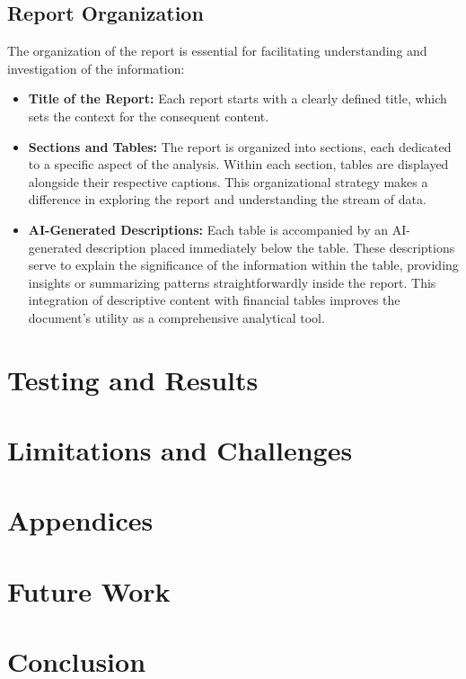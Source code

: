 \subsection{Report Organization}
The organization of the report is essential for facilitating understanding and investigation of the information: %
\begin{itemize}
    \item \textbf{Title of the Report:} Each report starts with a clearly defined title, which sets the context for the consequent content.
    
    \item \textbf{Sections and Tables:} The report is organized into sections, each dedicated to a specific aspect of the analysis. Within each section, tables are displayed alongside their respective captions. This organizational strategy makes a difference in exploring the report and understanding the stream of data.
    
    \item \textbf{AI-Generated Descriptions:} Each table is accompanied by an AI-generated description placed immediately below the table. These descriptions serve to explain the significance of the information within the table, providing insights or summarizing patterns straightforwardly inside the report. This integration of descriptive content with financial tables improves the document's utility as a comprehensive analytical tool.
\end{itemize}

\section{Testing and Results}


\section{Limitations and Challenges}


\section{Appendices}


\section{Future Work}


\section{Conclusion}

